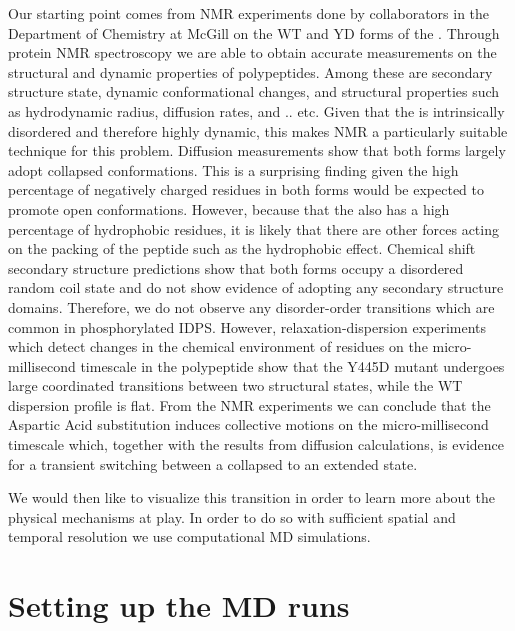Our starting point comes from NMR experiments done by collaborators in the Department of Chemistry at McGill on the WT and YD forms of the \gct. Through protein NMR spectroscopy we are able to obtain accurate measurements on the structural and dynamic properties of polypeptides. Among these are secondary structure state, dynamic conformational changes, and structural properties such as hydrodynamic radius, diffusion rates, and .. etc. Given that the \gct is intrinsically disordered and therefore highly dynamic, this makes NMR a particularly suitable technique for this problem. Diffusion measurements show that both forms largely adopt collapsed conformations.  This is a surprising finding given the high percentage of negatively charged residues  in both forms would be expected to promote open conformations. However, because that the \gct also has a high percentage of hydrophobic residues,  it is likely that there are other forces acting on the packing of the peptide such as the hydrophobic effect. Chemical shift secondary structure predictions show that both forms occupy a disordered random coil state and do not show evidence of adopting any secondary structure domains. Therefore, we do not observe any disorder-order transitions which are common in phosphorylated IDPS. However, relaxation-dispersion experiments which detect changes in the chemical environment of residues on the micro-millisecond timescale in the polypeptide show that the Y445D mutant undergoes large coordinated transitions between two structural states, while the WT dispersion profile is flat. From the NMR experiments we can conclude that the Aspartic Acid substitution induces collective motions on the micro-millisecond timescale which, together with the results from diffusion calculations, is evidence for a transient switching between a collapsed to an extended state. 

We would then like to visualize this transition in order to learn more about the physical mechanisms at play. In order to do so with sufficient spatial and temporal resolution we use computational MD simulations. 

\section{Setting up the MD runs}

